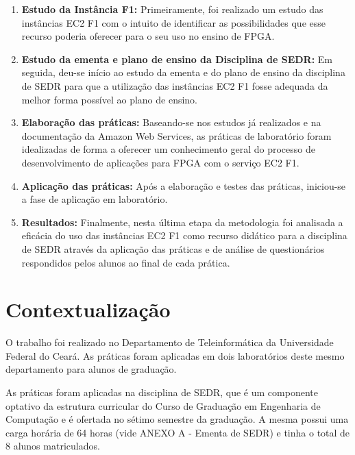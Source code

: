\begin{enumerate}
    \item \textbf{Estudo da Instância F1:} Primeiramente, foi realizado um estudo das instâncias EC2 F1 com o intuito de identificar as possibilidades que esse recurso poderia oferecer para o seu uso no ensino de FPGA.
    
    \item \textbf{Estudo da ementa e plano de ensino da Disciplina de SEDR:} Em seguida, deu-se início ao estudo da ementa e do plano de ensino da disciplina de SEDR para que a utilização das instâncias EC2 F1 fosse adequada da melhor forma possível ao plano de ensino.
    
    \item \textbf{Elaboração das práticas:} Baseando-se nos estudos já realizados e na documentação da Amazon Web Services, as práticas de laboratório foram idealizadas de forma a oferecer um conhecimento geral do processo de desenvolvimento de aplicações para FPGA com o serviço EC2 F1.
    
    \item \textbf{Aplicação das práticas:} Após a elaboração e testes das práticas, iniciou-se a fase de aplicação em laboratório.
    
    \item \textbf{Resultados:} Finalmente, nesta última etapa da metodologia foi analisada a eficácia do uso das instâncias EC2 F1 como recurso didático para a disciplina de SEDR através da aplicação das práticas e de análise de questionários respondidos pelos alunos ao final de cada prática.
	  
\end{enumerate}

  
\section{Contextualização}\label{sec: contextuaizacao}

O trabalho foi realizado no Departamento de Teleinformática da Universidade Federal do Ceará. As práticas foram aplicadas em dois laboratórios deste mesmo departamento para alunos de graduação.

As práticas foram aplicadas na disciplina de SEDR, que é um componente optativo da estrutura curricular do Curso de Graduação em Engenharia de Computação e é ofertada no sétimo semestre da graduação. A mesma possui  uma carga horária de 64 horas (vide ANEXO A - Ementa de SEDR) e tinha o total de 8 alunos matriculados. 

